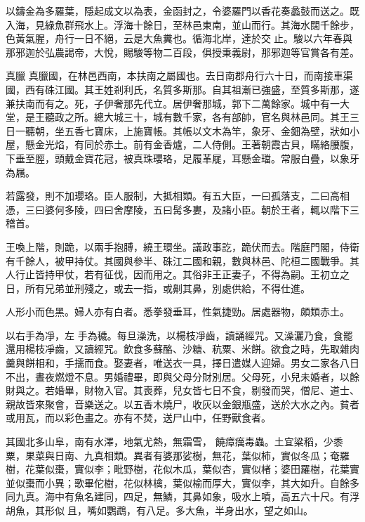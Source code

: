 \begin{pinyinscope}
 以鑄金為多羅葉，隱起成文以為表，金函封之，令婆羅門以香花奏蠡鼓而送之。既入海，見綠魚群飛水上。浮海十餘日，至林邑東南，並山而行。其海水闊千餘步，色黃氣腥，舟行一日不絕，云是大魚糞也。循海北岸，達於交止。駿以六年春與那邪迦於弘農謁帝，大悅，賜駿等物二百段，俱授秉義尉，那邪迦等官賞各有差。



 真臘
 真臘國，在林邑西南，本扶南之屬國也。去日南郡舟行六十日，而南接車渠國，西有硃江國。其王姓剎利氏，名質多斯那。自其祖漸已強盛，至質多斯那，遂兼扶南而有之。死，子伊奢那先代立。居伊奢那城，郭下二萬餘家。城中有一大堂，是王聽政之所。總大城三十，城有數千家，各有部帥，官名與林邑同。其王三日一聽朝，坐五香七寶床，上施寶帳。其帳以文木為竿，象牙、金鈿為壁，狀如小屋，懸金光焰，有同於赤土。前有金香爐，二人侍側。王著朝霞古貝，瞞絡腰腹，下垂至脛，頭戴金寶花冠，被真珠瓔珞，足履革屣，耳懸金璫。常服白疊，以象牙為屩。



 若露發，則不加瓔珞。臣人服制，大抵相類。有五大臣，一曰孤落支，二曰高相憑，三曰婆何多陵，四曰舍摩陵，五曰髯多婁，及諸小臣。朝於王者，輒以階下三稽首。



 王喚上階，則跪，以兩手抱膊，繞王環坐。議政事訖，跪伏而去。階庭門閣，侍衛有千餘人，被甲持仗。其國與參半、硃江二國和親，數與林邑、陀桓二國戰爭。其人行止皆持甲仗，若有征伐，因而用之。其俗非王正妻子，不得為嗣。王初立之日，所有兄弟並刑殘之，或去一指，或劓其鼻，別處供給，不得仕進。



 人形小而色黑。婦人亦有白者。悉拳發垂耳，性氣捷勁。居處器物，頗類赤土。



 以右手為凈，左
 手為穢。每旦澡洗，以楊枝凈齒，讀誦經咒。又澡灑乃食，食罷還用楊枝凈齒，又讀經咒。飲食多蘇酪、沙糖、秔粟、米餅。欲食之時，先取雜肉羹與餅相和，手擩而食。娶妻者，唯送衣一具，擇日遣媒人迎婦。男女二家各八日不出，晝夜燃燈不息。男婚禮畢，即與父母分財別居。父母死，小兒未婚者，以餘財與之。若婚畢，財物入官。其喪葬，兒女皆七日不食，剔發而哭，僧尼、道士、親故皆來聚會，音樂送之。以五香木燒尸，收灰以金銀瓶盛，送於大水之內。貧者或用瓦，而以彩色畫之。亦有不焚，送尸山中，任野獸食者。



 其國北多山阜，南有水澤，地氣尤熱，無霜雪，
 饒瘴癘毒蟲。土宜粱稻，少黍粟，果菜與日南、九真相類。異者有婆那娑樹，無花，葉似柿，實似冬瓜；奄羅樹，花葉似棗，實似李；毗野樹，花似木瓜，葉似杏，實似楮；婆田羅樹，花葉實並似棗而小異；歌畢佗樹，花似林檎，葉似榆而厚大，實似李，其大如升。自餘多同九真。海中有魚名建同，四足，無鱗，其鼻如象，吸水上噴，高五六十尺。有浮胡魚，其形似且，嘴如鸚鵡，有八足。多大魚，半身出水，望之如山。




\end{pinyinscope}
